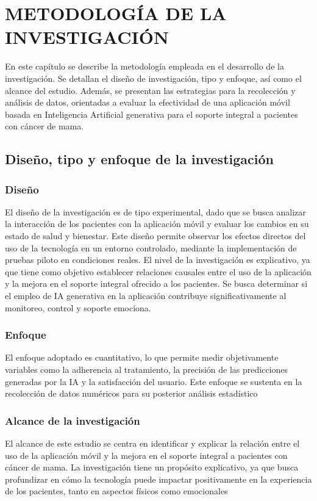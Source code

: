 \chapter{METODOLOGÍA DE LA INVESTIGACIÓN}

En este capítulo se describe la metodología empleada en el desarrollo de la investigación. Se detallan el diseño de investigación, tipo y enfoque, así como el alcance del estudio. Además, se presentan las estrategias para la recolección y análisis de datos, orientadas a evaluar la efectividad de una aplicación móvil basada en Inteligencia Artificial generativa para el soporte integral a pacientes con cáncer de mama.

\section{Diseño, tipo y enfoque de la investigación}

\subsection{Diseño}

El diseño de la investigación es de tipo experimental, dado que se busca analizar la interacción de los pacientes con la aplicación móvil y evaluar los cambios en su estado de salud y bienestar. Este diseño permite observar los efectos directos del uso de la tecnología en un entorno controlado, mediante la implementación de pruebas piloto en condiciones reales. El nivel de la investigación es explicativo, ya que tiene como objetivo establecer relaciones causales entre el uso de la aplicación y la mejora en el soporte integral ofrecido a los pacientes. Se busca determinar si el empleo de IA generativa en la aplicación contribuye significativamente al monitoreo, control y soporte emociona.

\subsection{Enfoque}
El enfoque adoptado es cuantitativo, lo que permite medir objetivamente variables como la adherencia al tratamiento, la precisión de las predicciones generadas por la IA y la satisfacción del usuario. Este enfoque se sustenta en la recolección de datos numéricos para su posterior análisis estadístico

\subsection{Alcance de la investigación}
El alcance de este estudio se centra en identificar y explicar la relación entre el uso de la aplicación móvil y la mejora en el soporte integral a pacientes con cáncer de mama. La investigación tiene un propósito explicativo, ya que busca profundizar en cómo la tecnología puede impactar positivamente en la experiencia de los pacientes, tanto en aspectos físicos como emocionales

